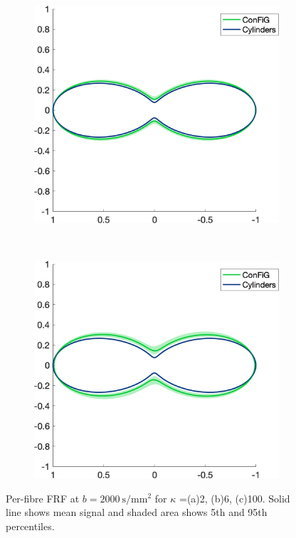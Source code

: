 \begin{figure}
  \centering
  \begin{subfigure}[]{0.4\textwidth}
    \includegraphics[width=\textwidth]{figures/frf_experiment/twoperp_prctiles_b_2000.png}
    \caption{}
  \end{subfigure}
  ~
  \begin{subfigure}[]{0.4\textwidth}
    \includegraphics[width=\textwidth]{figures/frf_experiment/threeperp10deg_prctiles_b_2000.png}
    \caption{}
  \end{subfigure}

  \caption{Per-fibre FRF at $b = \SI{2000}{\second\per\milli\metre\squared}$ for $\kappa$ =(a)2, (b)6, (c)100. Solid line shows mean signal and shaded area shows 5th and 95th percentiles. }
  \label{fig:frf_prctiles_kappa_b2000}
\end{figure}

